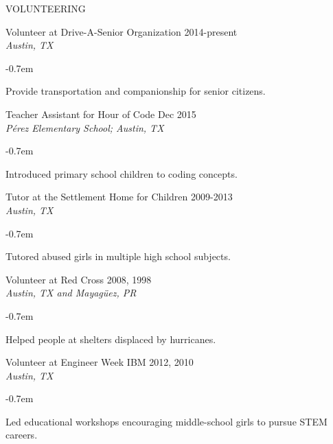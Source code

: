 \documentclass{resume} %
\begin{document}
\begin{rSection}{VOLUNTEERING} \itemsep -1pt {}
\vspace{-0.5em}
{Volunteer at Drive-A-Senior Organization \hfill 2014-present\\
\textit{Austin, TX} \\
\vspace{-1.3em}
  \begin{list}{}{\leftmargin=1em \rightmargin=7em } 
   \itemsep -0.7em \vspace{-0.6em} 
   \item Provide transportation and companionship for senior citizens.
  \end{list}}

{Teacher Assistant for Hour of Code \hfill Dec 2015\\
\textit{P\'erez Elementary School; Austin, TX}  \\
\vspace{-1.3em}
  \begin{list}{}{\leftmargin=1em \rightmargin=7em }
   \itemsep -0.7em \vspace{-0.6em} 
   \item Introduced primary school children to coding concepts.
  \end{list}}

{Tutor at the Settlement Home for Children \hfill 2009-2013\\
\textit{Austin, TX}  \\
\vspace{-1.3em}
  \begin{list}{}{\leftmargin=1em \rightmargin=7em } 
   \itemsep -0.7em \vspace{-0.6em} 
   \item Tutored abused girls in multiple high school subjects.
  \end{list}}

{Volunteer at Red Cross \hfill 2008, 1998\\
\textit{Austin, TX and Mayag\"uez, PR}  \\
\vspace{-1.3em}
  \begin{list}{}{\leftmargin=1em \rightmargin=7em } 
   \itemsep -0.7em \vspace{-0.6em} 
   \item Helped people at shelters displaced by hurricanes.
  \end{list}}

{Volunteer at Engineer Week IBM \hfill 2012, 2010\\
\textit{Austin, TX}  \\
\vspace{-1.3em}
  \begin{list}{}{\leftmargin=1em \rightmargin=7em } 
   \itemsep -0.7em \vspace{-0.6em} 
   \item Led educational workshops encouraging middle-school girls to pursue STEM careers.
  \end{list}}


\end{rSection}
\end{document}

